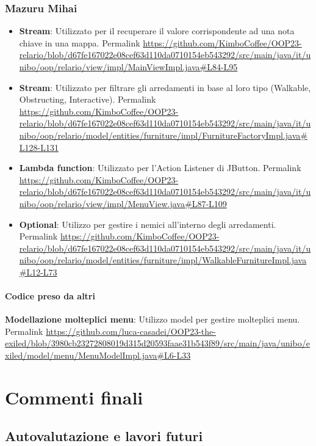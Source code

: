\documentclass[a4paper,12pt]{report}
\begin{document}
\subsection{Mazuru Mihai}
\begin{itemize}
	\item \textbf{Stream}: Utilizzato per il recuperare il valore corrispondente ad una nota chiave in una mappa.
	Permalink \url{https://github.com/KimboCoffee/OOP23-relario/blob/d67fe167022e08cef63d110da0710154eb543292/src/main/java/it/unibo/oop/relario/view/impl/MainViewImpl.java#L84-L95}
    
	\item \textbf{Stream}: Utilizzato per filtrare gli arredamenti in base al loro tipo (Walkable, Obstructing, Interactive).
	Permalink \url{https://github.com/KimboCoffee/OOP23-relario/blob/d67fe167022e08cef63d110da0710154eb543292/src/main/java/it/unibo/oop/relario/model/entities/furniture/impl/FurnitureFactoryImpl.java#L128-L131}

	\item \textbf{Lambda function}: Utilizzato per l’Action Listener di JButton.
	Permalink \url{https://github.com/KimboCoffee/OOP23-relario/blob/d67fe167022e08cef63d110da0710154eb543292/src/main/java/it/unibo/oop/relario/view/impl/MenuView.java#L87-L109}

	\item \textbf{Optional}: Utilizzo per gestire i nemici all'interno degli arredamenti.
	Permalink \url{https://github.com/KimboCoffee/OOP23-relario/blob/d67fe167022e08cef63d110da0710154eb543292/src/main/java/it/unibo/oop/relario/model/entities/furniture/impl/WalkableFurnitureImpl.java#L12-L73}
\end{itemize}

\subsubsection{Codice preso da altri}
\textbf{Modellazione molteplici menu}: Utilizzo model per gestire molteplici menu.
Permalink \url{https://github.com/luca-casadei/OOP23-the-exiled/blob/3980cb23272808019d315d20593faae31b543f89/src/main/java/unibo/exiled/model/menu/MenuModelImpl.java#L6-L33}

\chapter{Commenti finali}

\section{Autovalutazione e lavori futuri}
\end{document}
